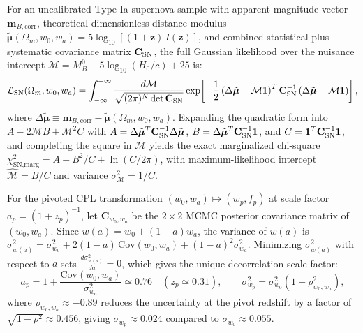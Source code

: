 \documentclass[11pt,letterpaper]{article}
\begin{document}
For an uncalibrated Type Ia supernova sample with apparent magnitude vector $\mathbf{m}_{B,\text{corr}}$, theoretical dimensionless distance modulus $\tilde{\boldsymbol{\mu}}(\Omega_m, w_0, w_a) = 5\log_{10}[(1+\mathbf{z})\, I(\mathbf{z})]$, and combined statistical plus systematic covariance matrix $\mathbf{C}_{\rm SN}$, the full Gaussian likelihood over the nuisance intercept $\mathcal{M} = M_B^0 - 5\log_{10}(H_0/c) + 25$ is:
\begin{equation}
    \mathcal{L}_{\rm SN}(\Omega_m, w_0, w_a) = \int_{-\infty}^{+\infty} \frac{d\mathcal{M}}{\sqrt{(2\pi)^N \det\mathbf{C}_{\rm SN}}} \exp\!\left[ -\frac{1}{2}\left(\Delta\tilde{\boldsymbol{\mu}} - \mathcal{M}\mathbf{1}\right)^T \mathbf{C}_{\rm SN}^{-1} \left(\Delta\tilde{\boldsymbol{\mu}} - \mathcal{M}\mathbf{1}\right) \right],
\end{equation}
where $\Delta\tilde{\boldsymbol{\mu}} \equiv \mathbf{m}_{B,\text{corr}} - \tilde{\boldsymbol{\mu}}(\Omega_m, w_0, w_a)$. Expanding the quadratic form into $A - 2\mathcal{M}B + \mathcal{M}^2 C$ with $A = \Delta\tilde{\boldsymbol{\mu}}^T \mathbf{C}_{\rm SN}^{-1} \Delta\tilde{\boldsymbol{\mu}}$, $B = \Delta\tilde{\boldsymbol{\mu}}^T \mathbf{C}_{\rm SN}^{-1} \mathbf{1}$, and $C = \mathbf{1}^T \mathbf{C}_{\rm SN}^{-1} \mathbf{1}$, and completing the square in $\mathcal{M}$ yields the exact marginalized chi-square $\chi^2_{\text{SN,marg}} = A - B^2/C + \ln(C/2\pi)$, with maximum-likelihood intercept $\hat{\mathcal{M}} = B/C$ and variance $\sigma_{\mathcal{M}}^2 = 1/C$.

For the pivoted CPL transformation $(w_0, w_a) \mapsto (w_p, f_p)$ at scale factor $a_p = (1+z_p)^{-1}$, let $\mathbf{C}_{w_0, w_a}$ be the $2\times 2$ MCMC posterior covariance matrix of $(w_0, w_a)$. Since $w(a) = w_0 + (1-a)w_a$, the variance of $w(a)$ is $\sigma^2_{w(a)} = \sigma_{w_0}^2 + 2(1-a)\,\text{Cov}(w_0, w_a) + (1-a)^2 \sigma_{w_a}^2$. Minimizing $\sigma^2_{w(a)}$ with respect to $a$ sets $\frac{d\sigma^2_{w(a)}}{da} = 0$, which gives the unique decorrelation scale factor:
\begin{equation}
    a_p = 1 + \frac{\text{Cov}(w_0, w_a)}{\sigma_{w_a}^2} \simeq 0.76 \quad (z_p \simeq 0.31), \qquad \sigma_{w_p}^2 = \sigma_{w_0}^2\left(1 - \rho_{w_0, w_a}^2\right),
\end{equation}
where $\rho_{w_0, w_a} \approx -0.89$ reduces the uncertainty at the pivot redshift by a factor of $\sqrt{1 - \rho^2} \approx 0.456$, giving $\sigma_{w_p} \approx 0.024$ compared to $\sigma_{w_0} \approx 0.055$.
\end{document}

